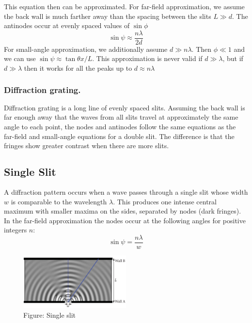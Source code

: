 \documentclass[../main.tex]{subfiles}
\begin{document}
This equation then can be approximated. For far-field approximation, we assume the back wall is much farther away than the spacing between the slits $L\gg d$. The antinodes occur at evenly spaced values of $\sin \phi$
\begin{equation*}
    \sin \psi \approx \frac{n\lambda}{2d}
\end{equation*}
For small-angle approximation, we additionally assume $d \gg n\lambda$. Then $\phi \ll 1$ and we can use $\sin \psi\approx \tan\theta x/L$. This approximation is never valid if $d \gg \lambda$, but if $d \gg \lambda$ then it works for all the peaks up to $d \approx n\lambda$

\subsubsection*{Diffraction grating.} Diffraction grating is a long line of evenly spaced slits. Assuming the back wall is far enough away that the waves from all slits travel at approximately the same angle to each point, the nodes and antinodes follow the same equations as the far-field and small-angle equations for a double slit. The difference is that the fringes show greater contrast when there are more slits. 

\subsection*{Single Slit}
A diffraction pattern occurs when a wave passes through a single slit whose width $w$ is comparable to the wavelength $\lambda$. This produces one intense central maximum with smaller maxima on the sides, separated by nodes (dark fringes). In the far-field approximation the nodes occur at the following angles for positive integers $n$:
\begin{equation*}
    \sin \psi=\frac{n\lambda}{w}
\end{equation*}
\begin{figure}
    \centering
    \includegraphics[width=0.5\textwidth]{../Rss/Waves/Slit.png}
    \caption*{Figure: Single slit}
\end{figure}
\end{document}
